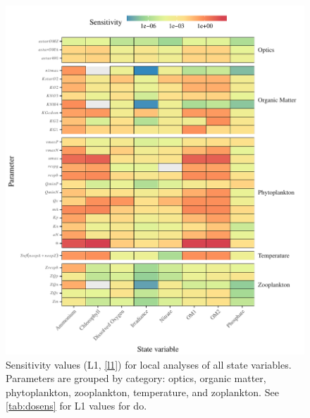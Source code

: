 \documentclass[letterpaper,12pt,oneside]{article}\usepackage[]{graphicx}\usepackage[]{color}
\begin{document}
\begin{figure}[!ht]

{\centering \includegraphics[width=\textwidth]{figs/sensalltile-1} 

}

\caption{Sensitivity values (L1, \cref{l1}) for local analyses of all state variables. Parameters are grouped by category: optics, organic matter, phytoplankton, zooplankton, temperature, and zoplankton.  See \cref{tab:dosens} for L1 values for \ac{do}.}\label{fig:sensalltile}
\end{figure}
\end{document}
